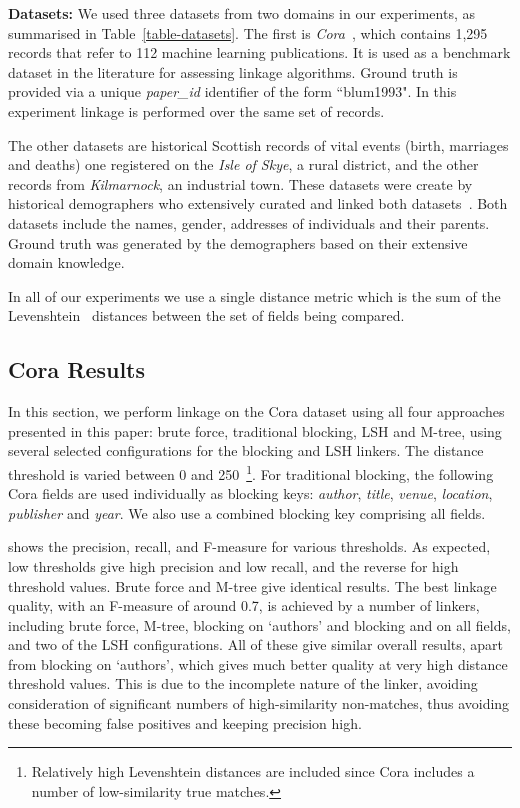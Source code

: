 \documentclass{llncs}
\begin{document}
\smallskip
\textbf{Datasets:}
\label{sec-data}
We used three datasets from two domains in our experiments, as
summarised in Table~\ref{table-datasets}. The first is
\emph{Cora}~\cite{Cora2017}, which contains 1,295 records that refer to
112 machine learning publications. It is used as a benchmark dataset in
the literature for assessing linkage algorithms. Ground truth is
provided via a unique \emph{paper\_id} identifier of the form
``blum1993". In this experiment linkage is performed over the same set
of records.

The other datasets are historical Scottish records of vital events
(birth, marriages and deaths) one registered on the \emph{Isle of Skye},
a rural district, and the other records from \emph{Kilmarnock}, an
industrial town. These datasets were create by historical demographers
who extensively curated and linked both
datasets~\cite{reid2002,reid2006}. Both datasets include the names,
gender, addresses of individuals and their parents. Ground truth was
generated by the demographers based on their extensive domain knowledge.

In all of our experiments we use a single distance metric which is the
sum of the Levenshtein~\cite{Levenshtein66} distances between the set of
fields being compared.

\subsection{Cora Results}

In this section, we perform linkage on the Cora dataset using all four
approaches presented in this paper: brute force, traditional blocking,
LSH and M-tree, using several selected configurations for the blocking
and LSH linkers. The distance threshold is varied between 0 and
250~\footnote{Relatively high Levenshtein distances are included since
Cora includes a number of low-similarity true matches.}. For traditional
blocking, the following Cora fields are used individually as blocking
keys: \textit{author}, \textit{title}, \textit{venue},
\textit{location}, \textit{publisher} and \textit{year}. We also use a
combined blocking key comprising all fields.

 shows the precision, recall, and F-measure for
various thresholds. As expected, low thresholds give high precision and
low recall, and the reverse for high threshold values. Brute force and
M-tree give identical results. The best linkage quality, with an
F-measure of around 0.7, is achieved by a number of linkers, including
brute force, M-tree, blocking on `authors' and blocking and on all
fields, and two of the LSH configurations. All of these give similar
overall results, apart from blocking on `authors', which gives much
better quality at very high distance threshold values. This is due to
the incomplete nature of the linker, avoiding consideration of
significant numbers of high-similarity non-matches, thus avoiding these
becoming false positives and keeping precision high.
\end{document}
